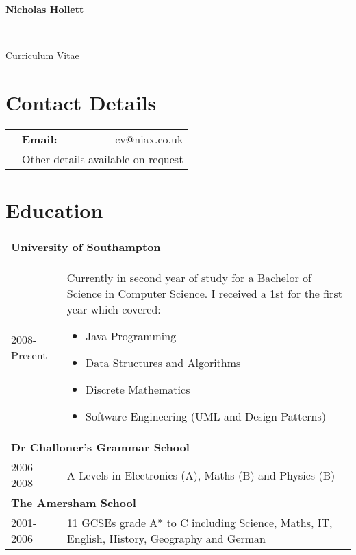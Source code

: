 \documentclass[11pt]{report}
\begin{document}
\pagestyle{empty}
\begin{center}
\begin{LARGE}
{\bf Nicholas Hollett}
\end{LARGE}\\[3pt]
\begin{large}
Curriculum Vitae
\end{large}
\end{center}
\section*{Contact Details}
\begin{center}
\begin{tabular*}{200pt}{ l@{\extracolsep{\fill}} l  r@{\extracolsep{\fill}} }
 & {\bf Email:} & cv@niax.co.uk \\
 & \multicolumn{2}{c}{Other details available on request}
\end{tabular*}
\end{center}
\section*{Education}
\begin{tabularx}{\textwidth}{ l X }
\multicolumn{2}{l}{\bf University of Southampton} \\
2008-Present &
Currently in second year of study for a Bachelor of Science in Computer Science.
I received a 1st for the first year which covered:
\begin{itemize}[topsep=0pt, partopsep=0pt, itemsep=0pt ,parsep=0pt]
\item Java Programming
\item Data Structures and Algorithms
\item Discrete Mathematics
\item Software Engineering (UML and Design Patterns)
\end{itemize} \\
\multicolumn{2}{l}{\bf Dr Challoner's Grammar School} \\
2006-2008 & A Levels in Electronics (A), Maths (B) and Physics (B) \\
\multicolumn{2}{l}{\bf The Amersham School} \\
2001-2006 & 11 GCSEs grade A* to C including Science, Maths, IT, English, History, Geography and German
\end{tabularx}
\end{document}
